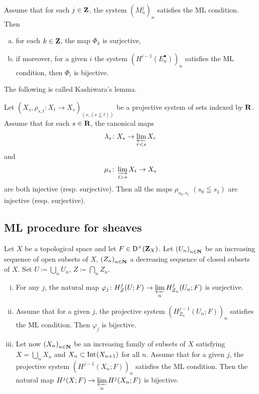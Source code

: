\begin{Proposition+}[{\cite[Proposition 1.12.4]{KS90}}]\label{prop:ks1.12.4}
  Assume that for each \(j\in\zz\), 
  the system \(\left(M_{n}^{j}\right)_{n}\) satisfies 
  the ML condition. 
  Then
  \begin{enumerate}[(a)]
    \item for each \(k\in \zz\), the map \(\varPhi_k\) is surjective,
    \item if moreover, for a given \(i\) the system \(\left(H^{i-1}(E_{n}^{\bullet})\right)_{n}\) satisfies the ML condition, then \(\varPhi_i\) is bijective.
  \end{enumerate} 
\end{Proposition+}

The following is called Kashiwara's lemma.

\begin{Proposition+}[{\cite[Proposition 1.12.6]{KS90}}]\label{prop:ks1.12.6}
  Let \(\left(X_s,\rho_{s,t}\colon X_t\to X_s\right)_{(s,(s\leqq t))}\) be 
  a projective system of sets indexed by \(\rr\). 
  Assume that for each \(s\in\rr\), the canonical maps\[
    \lambda_s\colon X_s\to\prolim[r<s]X_r
  \] and \[
    \mu_s\colon \indlim[t>s]X_t\to X_s
  \] are both injective (resp. surjective). 
  Then all the maps \(\rho_{s_{0},s_{1}}\) \((s_0\leqq s_1)\) are 
  injective (resp. surjective).
\end{Proposition+}

\subsection*{ML procedure for sheaves}

\begin{Proposition+}[{\cite[Proposition 2.7.1]{KS90}}]\label{prop:ks2.7.1}
  Let \(X\) be a topological space and let \(F\in\Dompl(\zz_X)\). 
  Let \(\left(U_n\right)_{n\in\nn}\) be an increasing sequence 
  of open subsets of \(X\), \(\left(Z_n\right)_{n\in\nn}\) 
  a decreasing sequence of closed subsets of \(X\). 
  Set \(U\coloneqq\bigcup_{n}U_{n}\), 
  \(Z\coloneqq\bigcap_{n}Z_{n}\). 
  \begin{enumerate}[(i)]
    \item \label{item:ks2.7.1.1} For any \(j\), the natural map \(
      \varphi_j\colon H^{j}_{Z}(U;F)
      \to 
      \prolim[n]H^{j}_{Z_{n}}(U_{n};F)
    \) is surjective. 
    \item \label{item:ks2.7.1.2} Assume that for a given \(j\), 
    the projective system \(
      (H^{j-1}_{Z_{n}}(U_{n};F))_{n}
    \) satisfies the ML condition. 
    Then \(\varphi_{j}\) is bijective. 
    \item \label{item:ks2.7.1.3} Let now \(\left(X_{n}\right)_{n\in\nn}\) be 
    an increasing family of subsets of \(X\) satisfying \(
      X=\bigcup_{n}X_n\) and \(X_{n}\subset \Int[](X_{n+1})
    \) for all \(n\). 
    Assume that for a given \(j\), the projective system \(
      \left(H^{j-1}(X_{n};F)\right)_{n}
    \) satisfies the ML condition. 
    Then the natural map \(
      H^{j}(X;F)\to \prolim[n]H^{j}(X_{n};F)
    \) is bijective. 
  \end{enumerate}
\end{Proposition+}

